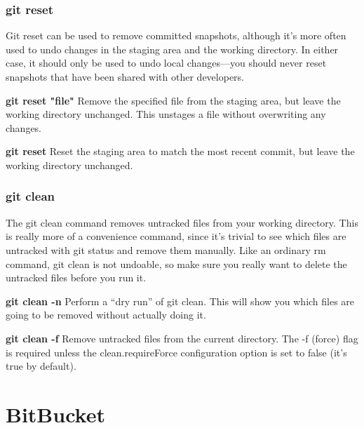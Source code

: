 \documentclass{article}
\begin{document}
	\subsubsection{git reset}
		Git reset can be used to remove committed snapshots, although it’s more often used to undo changes in the staging area and the working directory. In either case, it should only be used to undo local changes—you should never reset snapshots that have been shared with other developers.

		\textbf{git reset "file"}
		Remove the specified file from the staging area, but leave the working directory unchanged. This unstages a file without overwriting any changes.

		\textbf{git reset}
		Reset the staging area to match the most recent commit, but leave the working directory unchanged. 

	\subsubsection{git clean}
		The git clean command removes untracked files from your working directory. This is really more of a convenience command, since it’s trivial to see which files are untracked with git status and remove them manually. Like an ordinary rm command, git clean is not undoable, so make sure you really want to delete the untracked files before you run it.

		\textbf{git clean -n}
		Perform a “dry run” of git clean. This will show you which files are going to be removed without actually doing it.

		\textbf{git clean -f}
		Remove untracked files from the current directory. The -f (force) flag is required unless the clean.requireForce configuration option is set to false (it's true by default). 


\section{BitBucket}
\end{document}
